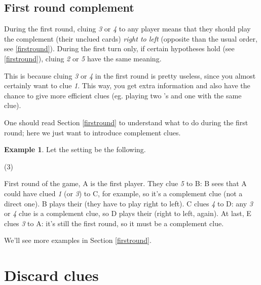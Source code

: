 \documentclass[a4paper]{article}
\theoremstyle{plain}
\theoremstyle{definition}
\newtheorem{example}[theorem]{Example}
\begin{document}
\subsection{First round complement}
\label{firstroundcomplement}

During the first round, cluing \textit{3} or \textit{4} to any player means that they should play the complement (their unclued cards) \textit{right to left} (opposite than the usual order, see \ref{firstround}). During the first turn only, if certain hypotheses hold (see \ref{firstround}), cluing \textit{2} or \textit{5} have the same meaning.

This is because cluing \textit{3} or \textit{4} in the first round is pretty useless, since you almost certainly want to clue \textit{1}. This way, you get extra information and also have the chance to give more efficient clues (eg. playing two 's and one  with the same clue).

One should read Section \ref{firstround} to understand what to do during the first round; here we just want to introduce complement clues.

\begin{example}
	
	Let the setting be the following.
	
	\begin{tasks}(3)
		\task[+]      
		\task[A]    
		\task[B]    
		\task[C]    
		\task[D]    
		\task[E]    
	\end{tasks}
	
	First round of the game, A is the first player. They clue \textit{5} to B: B sees that A could have clued \textit{1} (or \textit{3}) to C, for example, so it's a complement clue (not a direct one). B plays their  (they have to play right to left). C clues \textit{4} to D: any \textit{3} or \textit{4} clue is a complement clue, so D plays their  (right to left, again). At last, E clues \textit{3} to A: it's still the first round, so it must be a complement clue.
\end{example}

We'll see more examples in Section \ref{firstround}.

\section{Discard clues}
\end{document}
